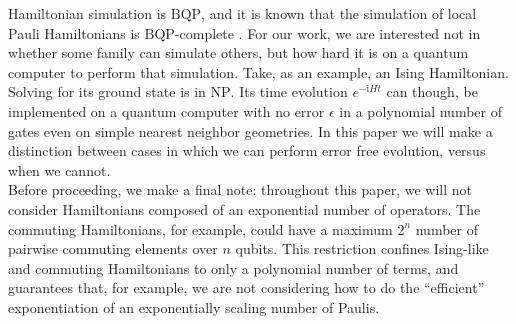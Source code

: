\documentclass[%
 aip,
 amsmath,amssymb,
 reprint,%
]{revtex4-1}
\begin{document}
Hamiltonian simulation is $\mathrm{BQP}$, and it is known that the simulation of local Pauli Hamiltonians is $\mathrm{BQP}$-complete .  For our work, we are interested not in whether some family can simulate others, but how hard it is on a quantum computer to perform that simulation. Take, as an example, an Ising Hamiltonian. Solving for its ground state is in $\mathrm{NP}$. 
Its time evolution $e^{-\mathrm{i}Ht}$ can though, be implemented on a quantum computer with no error $\epsilon$ in a polynomial number of gates even on simple nearest neighbor geometries. In this paper we will make a distinction between cases in which we can perform error free evolution, versus when we cannot. \\ 
\indent Before proceeding, we make a final note: throughout this paper, we will not consider Hamiltonians composed of an exponential number of operators. The commuting Hamiltonians, for example, could have a maximum $2^n$ number of pairwise commuting elements over $n$ qubits. This restriction confines Ising-like and commuting Hamiltonians to only a polynomial number of terms, and guarantees that, for example, we are not considering how to do the ``efficient'' exponentiation of an exponentially scaling number of Paulis.  \\
\end{document}
